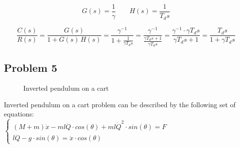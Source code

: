 \documentclass[10pt]{article}
\begin{document}
		    \begin{equation*}
		        G(s) = \frac{1}{\gamma} \qquad H(s) = \frac{1}{T_d s}
		    \end{equation*}
		
		    \begin{equation*}
		        \frac{C(s)}{R(s)} =
		        \frac{G(s)}{1 + G(s) \, H(s)} =
		        \frac{\gamma^{-1}}{1 + \frac{1}{\gamma T_d s}} =
		        \frac{\gamma^{-1}}{\frac{\gamma T_d s + 1}{\gamma T_d s}} =
		        \frac{\gamma^{-1} \cdot \gamma T_d s}{\gamma T_d s + 1} =
		        \frac{T_d s}{1 + \gamma T_d s}
		    \end{equation*}
		\subsection{Problem 5}
			\begin{figure}[h!]
				\caption{Inverted pendulum on a cart}
				\label{fig:modules}
			\end{figure}
			
			Inverted pendulum on a cart problem can be described by the following set of equations:\\

			$\begin{cases}
				(M+m) \ddot{x} - ml \ddot{Q} \cdot cos(\theta) + ml \dot{Q}^2 \cdot sin(\theta) = F\\
				l \ddot{Q} - g \cdot sin(\theta) = \ddot{x} \cdot cos(\theta)
			\end{cases}$
			
\end{document}
